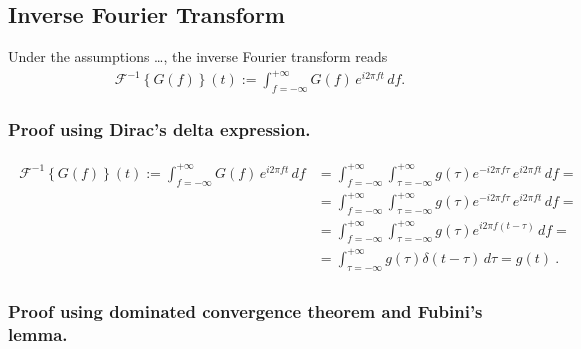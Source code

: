 \documentclass[letterpaper,10pt,english]{jupyterBook}
\begin{document}
\sphinxAtStartPar
{}

\sphinxAtStartPar
{}

\sphinxAtStartPar
{}

\sphinxAtStartPar
{}


\subsection{Inverse Fourier Transform}
\label{\detokenize{ch/complex/fourier-transform:inverse-fourier-transform}}\label{\detokenize{ch/complex/fourier-transform:complex-fourier-transform-inverse}}
\sphinxAtStartPar
Under the assumptions …, the inverse Fourier transform reads
\begin{equation*}
\begin{split}\mathscr{F}^{-1}\left\{ G(f) \right\}(t) := \int_{f = -\infty}^{+\infty} G(f) \, e^{i 2 \pi f t} \, df .\end{split}
\end{equation*}\subsubsection*{Proof using Dirac’s delta expression.}
\begin{equation*}
\begin{split}\begin{aligned}
\mathscr{F}^{-1}\left\{ G(f) \right\}(t) := \int_{f = -\infty}^{+\infty} G(f) \, e^{i 2 \pi f t} \, df 
  & = \int_{f = -\infty}^{+\infty} \int_{\tau=-\infty}^{+\infty} g(\tau) e^{-i 2 \pi f \tau} \, e^{i 2 \pi f t} \, df = \\ 
  & = \int_{f = -\infty}^{+\infty} \int_{\tau=-\infty}^{+\infty} g(\tau) e^{-i 2 \pi f \tau} \, e^{i 2 \pi f t} \, df = \\ 
  & = \int_{f = -\infty}^{+\infty} \int_{\tau=-\infty}^{+\infty} g(\tau) e^{i 2 \pi f (t-\tau)} \, df = \\ 
  & = \int_{\tau=-\infty}^{+\infty} g(\tau) \delta(t-\tau) \, d\tau = g(t) \ . 
\end{aligned}\end{split}
\end{equation*}\subsubsection*{Proof using dominated convergence theorem and Fubini’s lemma.}
\end{document}
